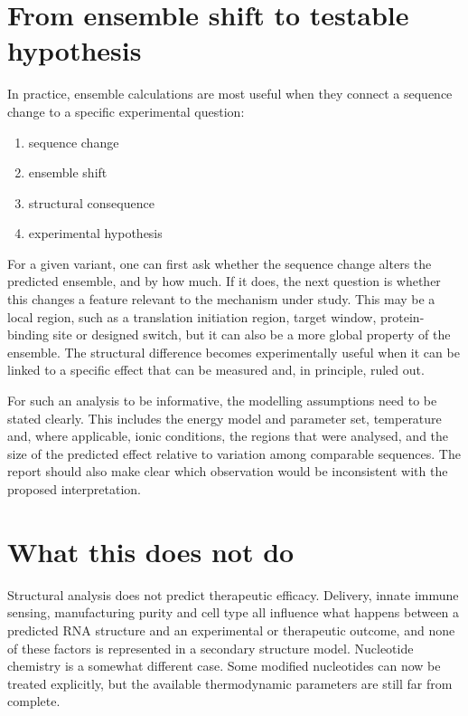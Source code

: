 \section{From ensemble shift to testable hypothesis}

In practice, ensemble calculations are most useful when they connect a sequence
change to a specific experimental question:

\begin{chain}
\begin{enumerate}
\item sequence change
\item ensemble shift
\item structural consequence
\item experimental hypothesis
\end{enumerate}
\end{chain}

For a given variant, one can first ask whether the sequence change alters
the predicted ensemble, and by how much. If it does, the next question
is whether this changes a feature relevant to the mechanism under study.
This may be a local region, such as a translation initiation region,
target window, protein-binding site or designed switch, but it can
also be a more global property of the ensemble. The structural
difference becomes experimentally useful when it can be linked to a
specific effect that can be measured and, in principle, ruled out.

For such an analysis to be informative, the modelling assumptions need to be
stated clearly. This includes the energy model and parameter set, temperature
and, where applicable, ionic conditions, the regions that were analysed, and the size of the
predicted effect relative to variation among comparable sequences. The report
should also make clear which observation would be inconsistent with the proposed
interpretation.

\section{What this does not do}

Structural analysis does not predict therapeutic efficacy. Delivery, innate
immune sensing, manufacturing purity and cell type all influence what happens
between a predicted RNA structure and an experimental or therapeutic outcome,
and none of these factors is represented in a secondary structure model.
Nucleotide chemistry is a somewhat different case. Some modified nucleotides
can now be treated explicitly, but the available thermodynamic parameters are
still far from complete.

